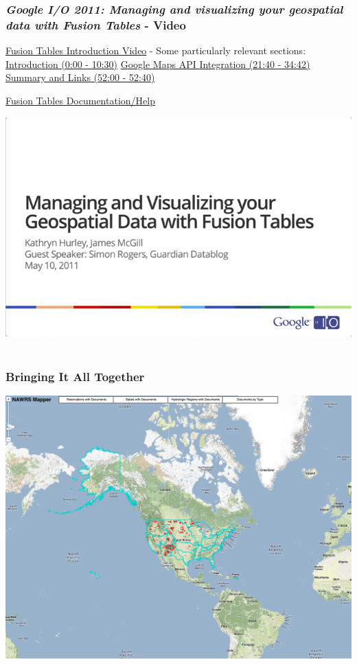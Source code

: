 \documentclass[]{article}
\begin{document}
\subsubsection{\emph{Google I/O 2011: Managing and visualizing your
geospatial data with Fusion Tables} -
Video}\label{google-io-2011-managing-and-visualizing-your-geospatial-data-with-fusion-tables---video}

\href{http://youtu.be/Z2o0mtnF1Bg}{Fusion Tables Introduction Video} -
Some particularly relevant sections:
\href{http://youtu.be/Z2o0mtnF1Bg}{Introduction (0:00 - 10:30)}
\textbar{} \href{http://youtu.be/Z2o0mtnF1Bg?t=21m40s}{Google Maps API
Integration (21:40 - 34:42)} \textbar{}
\href{http://youtu.be/Z2o0mtnF1Bg?t=52m}{Summary and Links (52:00 -
52:40)}

\href{http://tinyurl.com/nxlgcwq}{Fusion Tables Documentation/Help}

\includegraphics{./images/fusionTablesVideo.png}~

\subsubsection{Bringing It All Together}\label{bringing-it-all-together}

\includegraphics{images/nawrs.jpg}~
\end{document}
